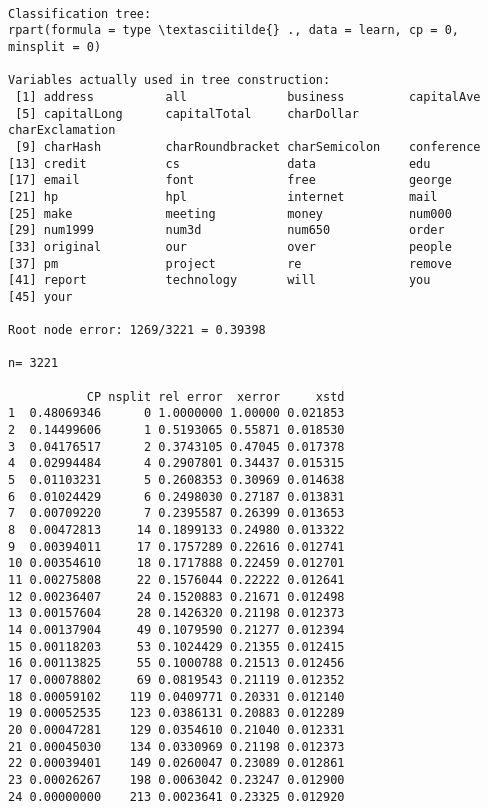 \documentclass[11pt]{article}
\begin{document}
    \begin{Verbatim}[commandchars=\\\{\}]

Classification tree:
rpart(formula = type \textasciitilde{} ., data = learn, cp = 0, minsplit = 0)

Variables actually used in tree construction:
 [1] address          all              business         capitalAve      
 [5] capitalLong      capitalTotal     charDollar       charExclamation 
 [9] charHash         charRoundbracket charSemicolon    conference      
[13] credit           cs               data             edu             
[17] email            font             free             george          
[21] hp               hpl              internet         mail            
[25] make             meeting          money            num000          
[29] num1999          num3d            num650           order           
[33] original         our              over             people          
[37] pm               project          re               remove          
[41] report           technology       will             you             
[45] your            

Root node error: 1269/3221 = 0.39398

n= 3221 

           CP nsplit rel error  xerror     xstd
1  0.48069346      0 1.0000000 1.00000 0.021853
2  0.14499606      1 0.5193065 0.55871 0.018530
3  0.04176517      2 0.3743105 0.47045 0.017378
4  0.02994484      4 0.2907801 0.34437 0.015315
5  0.01103231      5 0.2608353 0.30969 0.014638
6  0.01024429      6 0.2498030 0.27187 0.013831
7  0.00709220      7 0.2395587 0.26399 0.013653
8  0.00472813     14 0.1899133 0.24980 0.013322
9  0.00394011     17 0.1757289 0.22616 0.012741
10 0.00354610     18 0.1717888 0.22459 0.012701
11 0.00275808     22 0.1576044 0.22222 0.012641
12 0.00236407     24 0.1520883 0.21671 0.012498
13 0.00157604     28 0.1426320 0.21198 0.012373
14 0.00137904     49 0.1079590 0.21277 0.012394
15 0.00118203     53 0.1024429 0.21355 0.012415
16 0.00113825     55 0.1000788 0.21513 0.012456
17 0.00078802     69 0.0819543 0.21119 0.012352
18 0.00059102    119 0.0409771 0.20331 0.012140
19 0.00052535    123 0.0386131 0.20883 0.012289
20 0.00047281    129 0.0354610 0.21040 0.012331
21 0.00045030    134 0.0330969 0.21198 0.012373
22 0.00039401    149 0.0260047 0.23089 0.012861
23 0.00026267    198 0.0063042 0.23247 0.012900
24 0.00000000    213 0.0023641 0.23325 0.012920

    \end{Verbatim}
\end{document}
